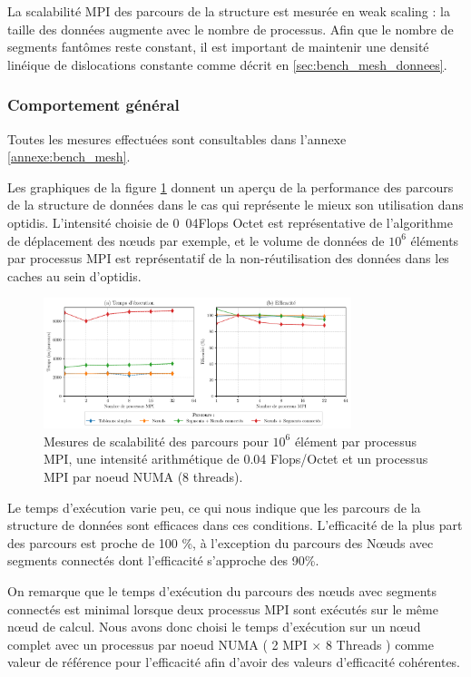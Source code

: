 La scalabilité MPI des parcours de la structure est mesurée en weak scaling : la taille des données augmente avec le nombre de processus. Afin que le nombre de segments fantômes reste constant, il est important de maintenir une densité linéique de dislocations constante comme décrit en \ref{sec:bench_mesh_donnees}.

\subsubsection{Comportement général}

Toutes les mesures effectuées sont consultables dans l'annexe \ref{annexe:bench_mesh}.

Les graphiques de la figure \ref{fig:bench_mesh_mpi_comportement_general} donnent un aperçu de la performance des parcours de la structure de données dans le cas qui représente le mieux son utilisation dans optidis. L'intensité choisie de \unit{0.04}{Flops \per Octet} est représentative de l'algorithme de déplacement des nœuds par exemple, et le volume de données de $10^6$ éléments par processus MPI est représentatif de la non-réutilisation des données dans les caches au sein d'optidis.

\begin{figure}
	\centering
	\includegraphics[width=0.8\textwidth]{img/bench_mesh_mpi_preview.pdf}
	\caption{Mesures de scalabilité des parcours pour $10^6$ élément par processus MPI, une intensité arithmétique de 0.04 Flops/Octet et un processus MPI par noeud NUMA (8 threads).}
	\label{fig:bench_mesh_mpi_comportement_general}
\end{figure}

Le temps d'exécution varie peu, ce qui nous indique que les parcours de la structure de données sont efficaces dans ces conditions. L'efficacité de la plus part des parcours est proche de 100 \%, à l'exception du parcours des Nœuds avec segments connectés dont l'efficacité s'approche des 90\%.

On remarque que le temps d'exécution du parcours des nœuds avec segments connectés est minimal lorsque deux processus MPI sont exécutés sur le même nœud de calcul. Nous avons donc choisi le temps d'exécution sur un nœud complet avec un processus par noeud NUMA ( 2 MPI $\times$ 8 Threads ) comme valeur de référence pour l'efficacité afin d'avoir des valeurs d'efficacité cohérentes.

